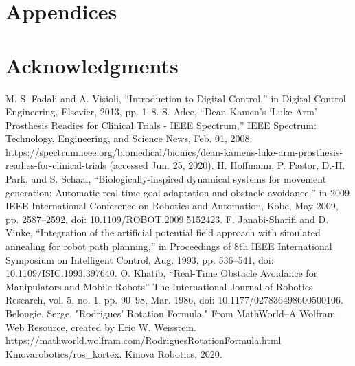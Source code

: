 \documentclass[a4paper, 10pt, conference]{ieeeconf}      %
\begin{document}



\section*{Appendices}

\section*{Acknowledgments}




\begin{thebibliography}{99}

 M. S. Fadali and A. Visioli, “Introduction to Digital Control,” in Digital Control Engineering, Elsevier, 2013, pp. 1–8.
 S. Adee, “Dean Kamen’s ‘Luke Arm’ Prosthesis Readies for Clinical Trials - IEEE Spectrum,” IEEE Spectrum: Technology, Engineering, and Science News, Feb. 01, 2008. https://spectrum.ieee.org/biomedical/bionics/dean-kamens-luke-arm-prosthesis-readies-for-clinical-trials (accessed Jun. 25, 2020).
 H. Hoffmann, P. Pastor, D.-H. Park, and S. Schaal, “Biologically-inspired dynamical systems for movement generation: Automatic real-time goal adaptation and obstacle avoidance,” in 2009 IEEE International Conference on Robotics and Automation, Kobe, May 2009, pp. 2587–2592, doi: 10.1109/ROBOT.2009.5152423.
 F. Janabi-Sharifi and D. Vinke, “Integration of the artificial potential field approach with simulated annealing for robot path planning,” in Proceedings of 8th IEEE International Symposium on Intelligent Control, Aug. 1993, pp. 536–541, doi: 10.1109/ISIC.1993.397640.
 O. Khatib, “Real-Time Obstacle Avoidance for Manipulators and Mobile Robots” The International Journal of Robotics Research, vol. 5, no. 1, pp. 90–98, Mar. 1986, doi: 10.1177/027836498600500106.
  Belongie, Serge. "Rodrigues' Rotation Formula." From MathWorld--A Wolfram Web Resource, created by Eric W. Weisstein. https://mathworld.wolfram.com/RodriguesRotationFormula.html 
 Kinovarobotics/ros\_kortex. Kinova Robotics, 2020.




\end{thebibliography}
\end{document}
